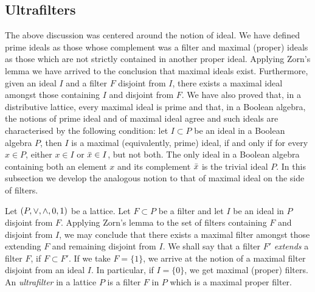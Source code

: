 \subsection{Ultrafilters}
The above discussion was centered around the notion of ideal. We have 
defined prime ideals as those whose complement was a filter and maximal
(proper) ideals as those which are not strictly contained in another proper
ideal. Applying Zorn's lemma we have arrived to the conclusion that maximal
ideals exist. Furthermore, given an ideal $I$ and a filter $F$ disjoint from
$I$, there exists a maximal ideal amongst those containing $I$ and disjoint
from $F$. We have also proved that, in a distributive lattice, every maximal
ideal is prime and that, in a Boolean algebra, the notions of prime ideal
and of maximal ideal agree and such ideals are characterised by the following
condition: let $I\subset P$ be an ideal in a Boolean algebra $P$, then $I$
is a maximal (equivalently, prime) ideal, if and only if for every $x\in P$,
either $x\in I$ or $\bar{x}\in I$, but not both. The only ideal in a Boolean
algebra containing both an element $x$ and its complement $\bar{x}$ is the
trivial ideal $P$. In this subsection we develop the analogous notion to that
of maximal ideal on the side of filters.

Let $(P,\vee,\wedge,0,1)$ be a lattice. Let $F\subset P$ be a filter
and let $I$ be an ideal in $P$ disjoint from $F$. Applying Zorn's lemma to
the set of filters containing $F$ and disjoint from $I$, we may conclude
that there exists a maximal filter amongst those extending $F$ and remaining
disjoint from $I$. We shall say that a filter $F'$ \emph{extends} a filter
$F$, if $F\subset F'$. If we take $F=\{1\}$, we arrive at the notion
of a maximal filter disjoint from an ideal $I$. In particular, if $I=\{0\}$,
we get maximal (proper) filters. An \emph{ultrafilter} in a lattice $P$
is a filter $F$ in $P$ which is a maximal proper filter.

